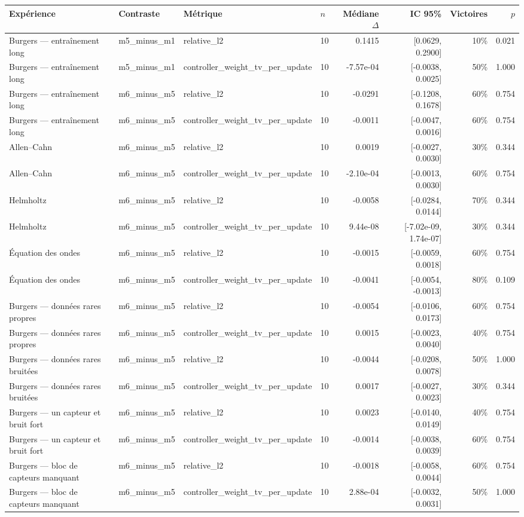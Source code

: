\begin{tabular}{llllrrrr}
\toprule
Expérience & Contraste & Métrique & $n$ & Médiane $\Delta$ & IC 95\% & Victoires & $p$ \\
\midrule
Burgers — entraînement long & m5\_minus\_m1 & relative\_l2 & 10 & 0.1415 & [0.0629, 0.2900] & 10\% & 0.021 \\
Burgers — entraînement long & m5\_minus\_m1 & controller\_weight\_tv\_per\_update & 10 & -7.57e-04 & [-0.0038, 0.0025] & 50\% & 1.000 \\
Burgers — entraînement long & m6\_minus\_m5 & relative\_l2 & 10 & -0.0291 & [-0.1208, 0.1678] & 60\% & 0.754 \\
Burgers — entraînement long & m6\_minus\_m5 & controller\_weight\_tv\_per\_update & 10 & -0.0011 & [-0.0047, 0.0016] & 60\% & 0.754 \\
Allen–Cahn & m6\_minus\_m5 & relative\_l2 & 10 & 0.0019 & [-0.0027, 0.0030] & 30\% & 0.344 \\
Allen–Cahn & m6\_minus\_m5 & controller\_weight\_tv\_per\_update & 10 & -2.10e-04 & [-0.0013, 0.0030] & 60\% & 0.754 \\
Helmholtz & m6\_minus\_m5 & relative\_l2 & 10 & -0.0058 & [-0.0284, 0.0144] & 70\% & 0.344 \\
Helmholtz & m6\_minus\_m5 & controller\_weight\_tv\_per\_update & 10 & 9.44e-08 & [-7.02e-09, 1.74e-07] & 30\% & 0.344 \\
Équation des ondes & m6\_minus\_m5 & relative\_l2 & 10 & -0.0015 & [-0.0059, 0.0018] & 60\% & 0.754 \\
Équation des ondes & m6\_minus\_m5 & controller\_weight\_tv\_per\_update & 10 & -0.0041 & [-0.0054, -0.0013] & 80\% & 0.109 \\
Burgers — données rares propres & m6\_minus\_m5 & relative\_l2 & 10 & -0.0054 & [-0.0106, 0.0173] & 60\% & 0.754 \\
Burgers — données rares propres & m6\_minus\_m5 & controller\_weight\_tv\_per\_update & 10 & 0.0015 & [-0.0023, 0.0040] & 40\% & 0.754 \\
Burgers — données rares bruitées & m6\_minus\_m5 & relative\_l2 & 10 & -0.0044 & [-0.0208, 0.0078] & 50\% & 1.000 \\
Burgers — données rares bruitées & m6\_minus\_m5 & controller\_weight\_tv\_per\_update & 10 & 0.0017 & [-0.0027, 0.0023] & 30\% & 0.344 \\
Burgers — un capteur et bruit fort & m6\_minus\_m5 & relative\_l2 & 10 & 0.0023 & [-0.0140, 0.0149] & 40\% & 0.754 \\
Burgers — un capteur et bruit fort & m6\_minus\_m5 & controller\_weight\_tv\_per\_update & 10 & -0.0014 & [-0.0038, 0.0039] & 60\% & 0.754 \\
Burgers — bloc de capteurs manquant & m6\_minus\_m5 & relative\_l2 & 10 & -0.0018 & [-0.0058, 0.0044] & 60\% & 0.754 \\
Burgers — bloc de capteurs manquant & m6\_minus\_m5 & controller\_weight\_tv\_per\_update & 10 & 2.88e-04 & [-0.0032, 0.0031] & 50\% & 1.000 \\
\bottomrule
\end{tabular}
